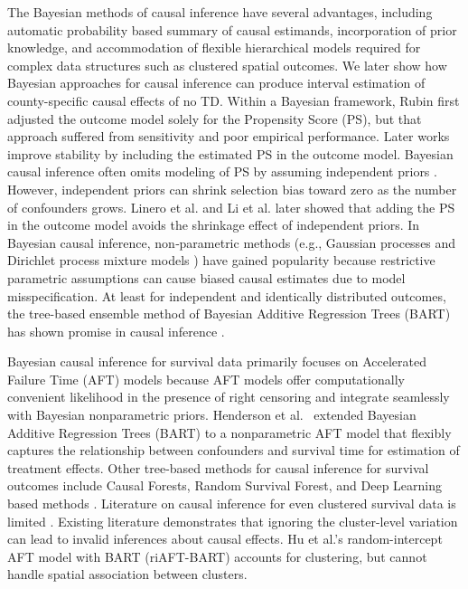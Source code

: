 \documentclass[aoas]{imsart}
\theoremstyle{plain}
\theoremstyle{definition}
\begin{document}
 The Bayesian methods of causal inference have several advantages, including automatic probability based summary of causal estimands, incorporation of prior knowledge, and accommodation of flexible hierarchical models required for complex data structures such as clustered spatial outcomes. 
 We later show how Bayesian approaches for causal inference can produce interval estimation of county-specific causal effects of no TD. Within a Bayesian framework, Rubin \cite{rubin1985propensity} first adjusted the outcome model solely for the Propensity Score (PS), but that approach suffered from sensitivity and poor empirical performance. 
 Later works \parencite{zigler2015propensity} improve stability by including the estimated PS in the outcome model. Bayesian causal inference often omits modeling of PS by assuming independent priors \parencite{Hu2022clusteredsurvival, li2023bayesian, Zang2023causal}. However, independent priors can shrink selection bias toward zero as the number of confounders grows.  Linero et al. \parencite{linero2023how} and Li et al. \parencite{li2023bayesian} later showed that adding the PS in the outcome model avoids the shrinkage effect of independent priors.
 In Bayesian causal inference, non‐parametric methods (e.g., Gaussian processes \parencite{xu2023bayesian} and Dirichlet process mixture models \parencite{Roy2018nonparametric, Arman2021nonparametric}) have gained popularity because restrictive parametric assumptions can cause biased causal estimates due to model misspecification. 
 At least for independent and identically distributed outcomes, the tree-based ensemble method of Bayesian Additive Regression Trees (BART) \parencite{Chipman10} has shown promise in causal inference \parencite{hill2011bayesian, dorie2019automated}. 
 







Bayesian causal inference for survival data primarily focuses on Accelerated Failure Time (AFT) models because AFT models offer computationally convenient likelihood in the presence of right censoring and integrate seamlessly with Bayesian nonparametric priors. Henderson et al.\ \parencite{henderson2020bayesian} extended Bayesian Additive Regression Trees (BART) to a nonparametric AFT model that flexibly captures the relationship between confounders and survival time for estimation of treatment effects. Other tree-based methods for causal inference for survival outcomes include Causal Forests, Random Survival Forest, and Deep Learning based methods \parencite{Zhang2017causalforest,  shen2018personalized, cui2023causal, tabib2020survivalrf}. 
Literature on causal inference for even clustered survival data is limited \parencite{Hu2022clusteredsurvival, Lee2024survival}. Existing literature demonstrates that ignoring the cluster-level variation can lead to invalid inferences about causal effects. Hu et al.'s \parencite{Hu2022clusteredsurvival} random-intercept AFT model with BART (riAFT-BART) accounts for clustering, but cannot handle spatial association between clusters.
\end{document}
